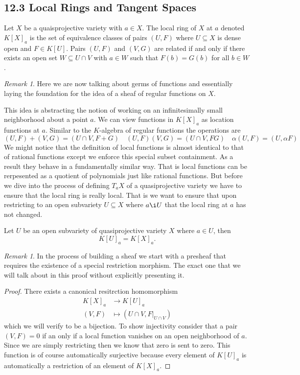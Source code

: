 \documentclass[40pt]{article}
\theoremstyle{remark}
\newtheorem{remark}[theorem]{Remark}
\begin{document}
		\subsection{12.3 Local Rings and Tangent Spaces}
		\begin{newdef}
			Let $X$ be a quaisprojective variety with $a \in X$. The local ring of $X$ at $a$ denoted $K[X]_a$ is the set of equivalence classes of pairs $(U,F)$ where $U\subseteq X$ is dense open and $F \in K[U]$. Pairs $(U,F)$ and $(V,G)$ are related if and only if there exists an open set $W \subseteq U \cap V$ with $a \in W$ such that $F(b)= G(b)$ for all $b \in W$. 
		\end{newdef}
		\begin{remark}
			Here we are now talking about germs of functions and essentially laying the foundation for the idea of a sheaf of regular functions on $X$. 
		\end{remark}
		This idea is abstracting the notion of working on an infinitesimally small neighborhood about a point $a$. We can view functions in $K[X]_a$ as location functions at $a$. Similar to the $K$-algebra of regular functions the operations are 
		\[
		(U,F) + (V,G) = (U \cap V, F + G) \quad (U,F)(V,G) = (U \cap V, FG) \quad \alpha(U,F) = (U,\alpha F)
		\]
		We might notice that the definition of local functions is almost identical to that of rational functions except we enforce this special subset containment. As a result they behave in a fundamentally similar way. That is local functions can be rerpesented as a quotient of polynomials just like rational functions. But before we dive into the process of defining $T_aX$ of a quasiprojective variety we have to ensure that the local ring is really local. That is we want to ensure that upon restricting to an open subvariety $U \subseteq X$ where $a \i U$ that the local ring at $a$ has not changed. 
		\begin{prop}
			Let $U$ be an open subvariety of quasiprojective variety $X$ where $a \in U$, then 
			\[
			K[U]_a = K[X]_a.
			\]
		\end{prop}
		\begin{remark}
			In the process of building a sheaf we start with a presheaf that requires the existence of a special restriction morphism. The exact one that we will talk about in this proof without explicitly presenting it. 
		\end{remark}
		\begin{proof}
			There exists a canonical resitrction homomorphism 
			\begin{align}
				K[X]_a &\to K[U]_a \\
				(V,F) &\mapsto (U \cap V, F|_{U \cap V})
			\end{align}
			which we will verify to be a bijection. To show injectivity consider that a pair $(V,F) = 0$ if an only if a local function vanishes on an open neighborhood of $a$. Since we are simply restricting then we know that zero is sent to zero. This function is of course automatically surjective because every element of $K[U]_a$ is automatically a restriction of an element of $K[X]_a$. 
		\end{proof}
\end{document}
